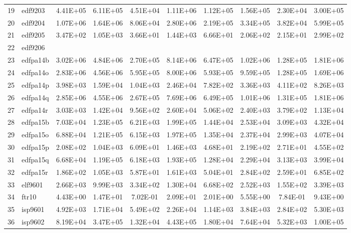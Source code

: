 \begin{landscape}
\begin{longtable}{@{}ll*{8}{S}@{}}
19 & edf9203   & 4.41E+05 & 6.11E+05 & 4.51E+04 & 1.11E+06 & 1.12E+05 & 1.56E+05 & 2.30E+04 & 3.00E+05 \\
20 & edf9204   & 1.07E+06 & 1.64E+06 & 8.06E+04 & 2.80E+06 & 2.19E+05 & 3.34E+05 & 3.82E+04 & 5.99E+05 \\
21 & edf9205   & 3.47E+02 & 1.05E+03 & 3.66E+01 & 1.44E+03 & 6.66E+01 & 2.06E+02 & 2.15E+01 & 2.99E+02 \\
22 & edf9206   &          &          &          &          &          &          &          &          \\
23 & edfpa14b  & 3.02E+06 & 4.84E+06 & 2.70E+05 & 8.14E+06 & 6.47E+05 & 1.02E+06 & 1.28E+05 & 1.81E+06 \\
24 & edfpa14o  & 2.83E+06 & 4.56E+06 & 5.95E+05 & 8.00E+06 & 5.93E+05 & 9.59E+05 & 1.28E+05 & 1.69E+06 \\
25 & edfpa14p  & 3.98E+03 & 1.59E+04 & 1.04E+03 & 2.46E+04 & 7.82E+02 & 3.36E+03 & 4.11E+02 & 8.26E+03 \\
26 & edfpa14q  & 2.85E+06 & 4.55E+06 & 2.67E+05 & 7.69E+06 & 6.49E+05 & 1.01E+06 & 1.31E+05 & 1.81E+06 \\
27 & edfpa14r  & 3.03E+03 & 1.42E+04 & 9.56E+02 & 2.60E+04 & 5.06E+02 & 2.40E+03 & 3.79E+02 & 1.13E+04 \\
28 & edfpa15b  & 7.03E+04 & 1.23E+05 & 6.21E+03 & 1.99E+05 & 1.44E+04 & 2.53E+04 & 3.09E+03 & 4.32E+04 \\
29 & edfpa15o  & 6.88E+04 & 1.21E+05 & 6.15E+03 & 1.97E+05 & 1.35E+04 & 2.37E+04 & 2.99E+03 & 4.07E+04 \\
30 & edfpa15p  & 2.08E+02 & 1.04E+03 & 6.09E+01 & 1.46E+03 & 4.68E+01 & 2.19E+02 & 2.71E+01 & 4.55E+02 \\
31 & edfpa15q  & 6.68E+04 & 1.19E+05 & 6.18E+03 & 1.93E+05 & 1.28E+04 & 2.29E+04 & 3.13E+03 & 3.99E+04 \\
32 & edfpa15r  & 1.86E+02 & 1.05E+03 & 5.87E+01 & 1.61E+03 & 5.04E+01 & 2.84E+02 & 2.59E+01 & 6.85E+02 \\
33 & elf9601   & 2.66E+03 & 9.99E+03 & 3.34E+02 & 1.30E+04 & 6.68E+02 & 2.52E+03 & 1.55E+02 & 3.39E+03 \\
34 & ftr10     & 4.43E+00 & 1.47E+01 & 7.02E-01 & 2.09E+01 & 2.01E+00 & 5.55E+00 & 7.84E-01 & 9.43E+00 \\
35 & isp9601   & 4.92E+03 & 1.71E+04 & 5.49E+02 & 2.26E+04 & 1.14E+03 & 3.84E+03 & 2.84E+02 & 5.30E+03 \\
36 & isp9602   & 8.19E+04 & 3.47E+05 & 1.32E+04 & 4.43E+05 & 1.80E+04 & 7.64E+04 & 5.32E+03 & 1.00E+05 \\

\end{longtable}
\end{landscape}
